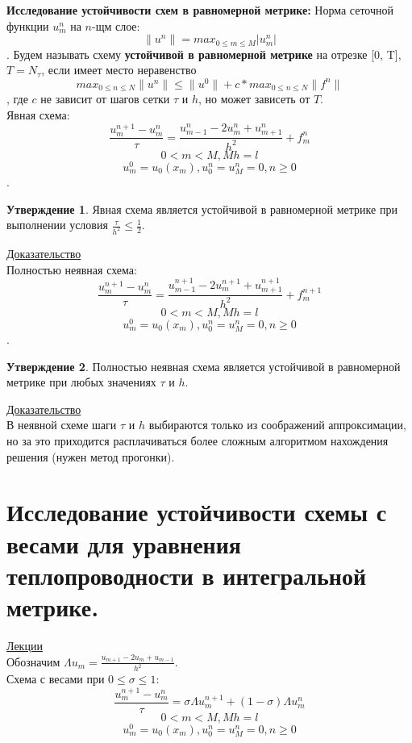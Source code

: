 \documentclass[specialist, subf, href, colorlinks=true, 12pt, times, mtpro, final]{disser}
\theoremstyle{definition}
\newtheorem{state}{Утверждение}[section]
\begin{document}
{    \textbf{Исследование устойчивости схем в равномерной метрике:}
    Норма сеточной функции $u_m^n$ на $n$-щм слое: 
    $$\|u^n\| = max_{0 \leqslant m \leqslant M}|u_m^n|$$.
    Будем называть схему \textbf{устойчивой в равномерной метрике} на отрезке [0, T], $T=N_{\tau}$, если имеет место неравенство
    $$max_{0 \leqslant n \leqslant N} \|u^n\| \leqslant \|u^0\| + c * max_{0 \leqslant n \leqslant N} \|f^n\|$$,
    где $c$ не зависит от шагов сетки $\tau$ и $h$, но может зависеть от $T$.\\
    Явная схема:
    $$\frac{u_m^{n+1} - u_m^n}{\tau} = \frac{u^n_{m-1}-2u^n_m +u^n_{m+1}}{h^2} + f_m^n$$
    $$0<m<M, Mh = l$$
    $$u^0_m = u_0(x_m), u_0^n=u_M^n=0, n \geqslant 0$$.
    \begin{state}
    	Явная схема является устойчивой в равномерной метрике при выполнении условия $\frac{\tau}{h^2} \leqslant \frac{1}{2}$. 
    \end{state}
    \hyperlink {lects.135}{Доказательство}\\
    
    Полностью неявная схема:
    $$\frac{u_m^{n+1} - u_m^n}{\tau} = \frac{u^{n+1}_{m-1}-2u^{n+1}_m + u^{n+1}_{m+1}}{h^2} + f_m^{n+1}$$
    $$0<m<M, Mh = l$$
    $$u^0_m = u_0(x_m), u_0^n=u_M^n=0, n \geqslant 0$$.
    
    \begin{state}
    	Полностью неявная схема является устойчивой в равномерной метрике при любых значениях $\tau$ и $h$. 
    \end{state}
    \hyperlink {lects.135}{Доказательство}\\
    
    В неявной схеме шаги $\tau$ и $h$ выбираются только из соображений аппроксимации, но за это приходится расплачиваться более сложным алгоритмом нахождения решения (нужен метод прогонки).	

\section {Исследование устойчивости схемы с весами для уравнения теплопроводности в интегральной метрике.}
    \hyperlink {lects.136}{Лекции}\\
    
    Обозначим $\Lambda u_m = \frac{u_{m+1} - 2u_m + u_{m-1}}{h^2}$.\\
    Схема с весами при $0 \leqslant \sigma \leqslant 1$:
    $$\frac{u_m^{n+1} - u_m^n}{\tau} = \sigma\Lambda u_m^{n+1} + (1 - \sigma)\Lambda u_m^n$$
    $$0<m<M, Mh = l$$
    $$u^0_m = u_0(x_m), u_0^n=u_M^n=0, n \geqslant 0$$
    
}
\end{document}
